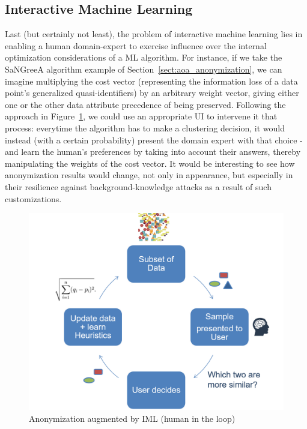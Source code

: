 \subsection{Interactive Machine Learning}
\label{ssect:fut_iml}

Last (but certainly not least), the problem of interactive machine learning lies in enabling a human domain-expert to exercise influence over the internal optimization considerations of a ML algorithm. For instance, if we take the SaNGreeA algorithm example of Section~\ref{sect:aoa_anonymization}, we can imagine multiplying the cost vector (representing the information loss of a data point's generalized quasi-identifiers) by an arbitrary weight vector, giving either one or the other data attribute precedence of being preserved. Following the approach in Figure~\ref{fig:anonIML}, we could use an appropriate UI to intervene it that process: everytime the algorithm has to make a clustering decision, it would instead (with a certain probability) present the domain expert with that choice - and learn the human's preferences by taking into account their answers, thereby manipulating the weights of the cost vector. It would be interesting to see how anonymization results would change, not only in appearance, but especially in their resilience against background-knowledge attacks as a result of such customizations.

\vspace{0.3cm}
\begin{figure}[ht]
	\begin{center}
		\includegraphics[width=1\textwidth]{figures/anonym/anonIML}
		\caption{Anonymization augmented by IML (human in the loop)}
		\label{fig:anonIML}
	\end{center}
\end{figure}
